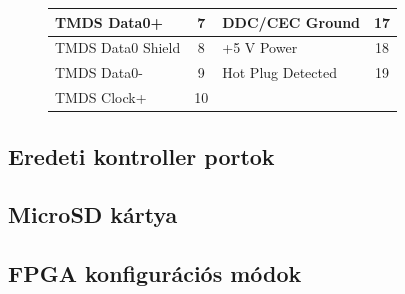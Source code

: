 \begin{figure}[H]
\begin{minipage}[]{\textwidth}
\begin{minipage}[b]{0.59\textwidth}
\begin{tabular}{|l|c|l|c|}
				TMDS Data0+       & 7                                                                                & DDC/CEC Ground    & 17                                                                               \\ \hline
				TMDS Data0 Shield & 8                                                                                & +5 V Power        & 18                                                                               \\ \hline
				TMDS Data0-       & 9                                                                                & Hot Plug Detected & 19                                                                               \\ \hline
				TMDS Clock+       & 10                                                                               &                   & \multicolumn{1}{l|}{}                                                            \\ \hline
			\end{tabular}
			\label{tab:HDMI-pinout}
		\end{minipage}
	\end{minipage}
	\end{figure} 
	
	\subsection{Eredeti kontroller portok}
	
	\subsection{MicroSD kártya}
	
	\subsection{FPGA konfigurációs módok}
	

